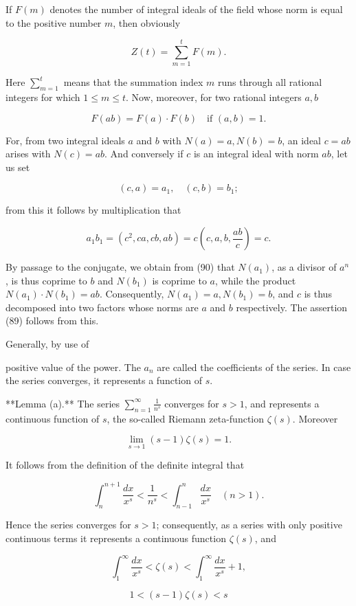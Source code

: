If $F(m)$ denotes the number of integral ideals of the field whose norm is equal to the positive number $m$, then obviously

$$Z(t) = \sum_{m=1}^{t} F(m).$$

Here $\sum_{m=1}^{t}$ means that the summation index $m$ runs through all rational integers for which $1 \leq m \leq t$. Now, moreover, for two rational integers $a, b$

$$F(ab) = F(a) \cdot F(b) \quad \text{if } (a, b) = 1. \tag{89}$$

For, from two integral ideals $a$ and $b$ with $N(a) = a, N(b) = b$, an ideal $c = ab$ arises with $N(c) = ab$. And conversely if $c$ is an integral ideal with norm $ab$, let us set

$$(c, a) = a_1, \quad (c, b) = b_1; \tag{90}$$

from this it follows by multiplication that

$$a_1 b_1 = (c^2, c a, c b, ab) = c \left( c, a, b, \frac{ab}{c} \right) = c.$$

By passage to the conjugate, we obtain from (90) that $N(a_1)$, as a divisor of $a^n$, is thus coprime to $b$ and $N(b_1)$ is coprime to $a$, while the product $N(a_1) \cdot N(b_1) = ab$. Consequently, $N(a_1) = a, N(b_1) = b$, and $c$ is thus decomposed into two factors whose norms are $a$ and $b$ respectively. The assertion (89) follows from this.

Generally, by use of

positive value of the power. The $a_n$ are called the coefficients of the series. In case the series converges, it represents a function of $s$.

**Lemma (a).** The series $\sum_{n=1}^{\infty} \frac{1}{n^s}$ converges for $s > 1$, and represents a continuous function of $s$, the so-called Riemann zeta-function $\zeta(s)$. Moreover

$$\lim_{s \to 1} (s - 1)\zeta(s) = 1.$$

It follows from the definition of the definite integral that

$$\int_{n}^{n+1} \frac{dx}{x^s} < \frac{1}{n^s} < \int_{n-1}^{n} \frac{dx}{x^s} \quad (n > 1).$$

Hence the series converges for $s > 1$; consequently, as a series with only positive continuous terms it represents a continuous function $\zeta(s)$, and

$$\int_{1}^{\infty} \frac{dx}{x^s} < \zeta(s) < \int_{1}^{\infty} \frac{dx}{x^s} + 1,$$

$$1 < (s - 1)\zeta(s) < s$$

